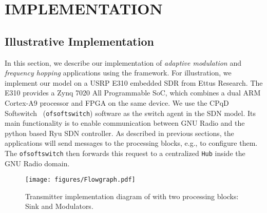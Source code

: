 \chapter{\uppercase {\crossflowcap Implementation}}
\label{sec:evaluation}

\section{Illustrative \crossflow Implementation}

In this section, we describe our implementation of \emph{adaptive modulation} and \emph{frequency hopping} applications using the \crossflow framework. For illustration, we implement our model on a USRP E310 embedded SDR from Ettus Research. The E310 provides a Zynq 7020 All Programmable SoC, which combines a dual ARM Cortex-A9 processor and FPGA on the same device. We use the CPqD Softswitch~\cite{ofsoftswitch13} (\texttt{ofsoftswitch}) software as the switch agent in the SDN model. Its main functionality is to enable communication between GNU Radio and the python based Ryu SDN controller. As described in previous sections, the applications will send messages to the processing blocks, e.g., to configure them. The \texttt{ofsoftswitch} then forwards this request to a centralized \texttt{\crossflow Hub} inside the GNU Radio domain. 

\begin{figure}[t]
  \centering
  \texttt{[image: figures/Flowgraph.pdf]}
  \caption{Transmitter implementation diagram of \crossflow with two processing blocks: Sink and Modulators.}
  \label{fig:flowgraph}
\end{figure}

